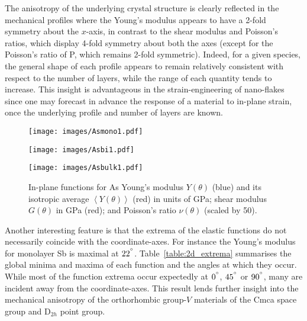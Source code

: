 The anisotropy of the underlying crystal structure 
is clearly reflected in the mechanical profiles 
where the Young's modulus  
appears to have a 2-fold symmetry 
about the $x$-axis, 
in contrast to the 
shear modulus and Poisson's ratios, 
which display 4-fold symmetry about both the axes 
(except for the Poisson's ratio of P, 
which remains 2-fold symmetric).
%
Indeed, for a given species, 
the general shape of each profile 
appears to remain relatively consistent 
with respect to the number of layers, 
while the range of each 
quantity tends to increase.
%
This insight is advantageous 
in the strain-engineering of nano-flakes 
since one may forecast in advance the 
response of a material to in-plane strain, 
once the underlying profile 
and number of layers are known.


\begin{figure}[th!]
\begin{subfloat}[Monolayer As]{
\texttt{[image: images/Asmono1.pdf]}
  \label{fig:asmono1}}
\end{subfloat}
%
\begin{subfloat}[Bilayer As]{
\texttt{[image: images/Asbi1.pdf]}
  \label{fig:asbi1}}
\end{subfloat}
%
\begin{subfloat}[Bulk As]{
\texttt{[image: images/Asbulk1.pdf]}
  \label{fig:asbulk1}}
\end{subfloat}
%
\caption[Arsenic in-plane mechanical properties]{
In-plane functions for As 
Young's modulus $Y\left(\theta\right)$ (blue)
and its isotropic average $\left<Y\left(\theta\right)\right>$ 
(red) in units of GPa; 
shear modulus $G\left(\theta\right)$ in GPa (red);
and Poisson's ratio $\nu\left(\theta\right)$ 
(scaled by 50).
}
\label{fig:as_2d_in_plane_figs}
\end{figure}


Another interesting feature is that 
the extrema of the elastic functions 
do not necessarily coincide 
with the coordinate-axes.
%
For instance the Young's modulus 
for monolayer Sb is maximal at $22^{\degree}$.
%
Table~\ref{table:2d_extrema} summarises   
the global minima and maxima of each function 
and the angles at which they occur.
%
While most of the function extrema occur 
expectedly at $0^{\degree}$, $45^{\degree}$ or $90^{\degree}$, 
many are incident away from the coordinate-axes.
%
This result lends further insight into  
the mechanical anisotropy of the 
orthorhombic group-$V$ materials 
of the Cmca space group and D$_{2h}$ point group.
%

